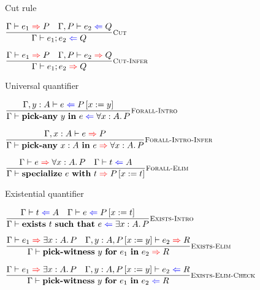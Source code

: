 \documentclass{beamer}
\begin{document}
\begin{frame}{Cut rule}

\begin{center}
  $\infrule[Cut]{\proofinfer{e_1}{P} \quad \proofcheck[\assume{\Gamma}{P}]{e_2}{Q}}{\proofcheck{\cut{e_1}{e_2}}{Q}}$

  \vspace{2em}

  $\infrule[Cut-Infer]{\proofinfer{e_1}{P} \quad \proofinfer[\assume{\Gamma}{P}]{e_2}{Q}}{\proofinfer{\cut{e_1}{e_2}}{Q}}$
\end{center}

\end{frame}

\begin{frame}{Universal quantifier}

\begin{center}
  $\infrule[Forall-Intro]{\proofcheck[\extend{\Gamma}{y}{A}]{e}{\subst{P}{x}{y}}}{\proofcheck{\allintro{y}{e}}{\All{x}[A]{P}}}$

  \vspace{2em}

  $\infrule[Forall-Intro-Infer]{\proofinfer[\extend{\Gamma}{x}{A}]{e}{P}}{\proofinfer{\allintro{x}[A]{e}}{\All{x}[A]{P}}}$

  \vspace{2em}

  $\infrule[Forall-Elim]{\proofinfer{e}{\All{x}[A]{P}} \quad \check{t}{A}}{\proofinfer{\allelim{e}{t}}{\subst{P}{x}{t}}}$
\end{center}

\end{frame}

\begin{frame}{Existential quantifier}

\begin{center}
  $\infrule[Exists-Intro]{\check{t}{A} \quad \proofcheck{e}{\subst{P}{x}{t}}}{\proofcheck{\exintro{t}{e}}{\Ex{x}[A]{P}}}$

  \vspace{2em}

  $\infrule[Exists-Elim]{\proofinfer{e_1}{\Ex{x}[A]{P}} \quad \proofinfer[\assume{\extend{\Gamma}{y}{A}}{\subst{P}{x}{y}}]{e_2}{R}}{\proofinfer{\exelim{y}{e_1}{e_2}}{R}}$

  \vspace{2em}

  $\infrule[Exists-Elim-Check]{\proofinfer{e_1}{\Ex{x}[A]{P}} \quad \proofcheck[\assume{\extend{\Gamma}{y}{A}}{\subst{P}{x}{y}}]{e_2}{R}}{\proofcheck{\exelim{y}{e_1}{e_2}}{R}}$
\end{center}

\end{frame}
\end{document}
